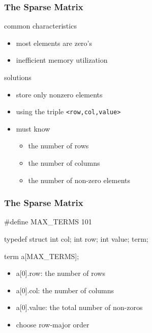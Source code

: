 \documentclass[newPxFont,sthlmFooter,nooffset]{beamer}
\begin{document}
\begin{frame}[t, fragile]
  \frametitle{The Sparse Matrix}
common characteristics
\begin{itemize}
\item most elements are zero's 
\item inefficient memory utilization
\end{itemize}
\bigskip

solutions
\begin{itemize}
\item store only nonzero elements
\item using the triple \texttt{<row,col,value>}
\item must know
  \begin{itemize}
  \item the number of rows
  \item the number of columns
  \item the number of non-zero elements
  \end{itemize}

\end{itemize}

\end{frame}

\begin{frame}[t, fragile]
  \frametitle{The Sparse Matrix}
\begin{codedef}
#define MAX_TERMS 101 

typedef struct {
    int col; 
    int row; 
    int value;
} term;

term a[MAX_TERMS];  
\end{codedef}
\begin{itemize}
\item a[0].row: the number of rows
\item a[0].col: the number of columns
\item a[0].value: the total number of non-zoros
\item choose row-major order
\end{itemize}
\end{frame}
\end{document}

